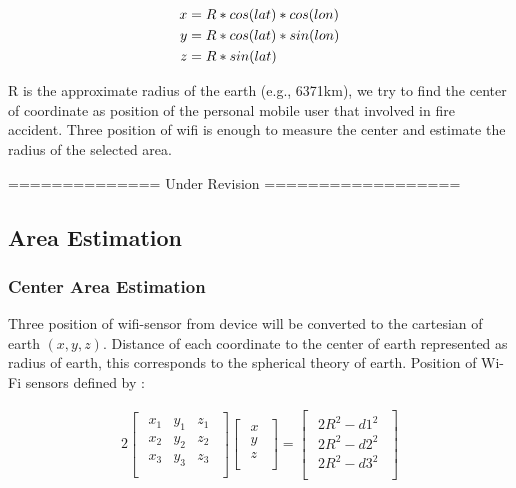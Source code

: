\documentclass[twocolumn,10pt]{asme2ej}
\begin{document}
	\begin{eqnarray}
	x &= R * cos(lat) * cos(lon) \notag \\
	y &= R * cos(lat) * sin(lon) \notag \\
	z &= R * sin(lat) 
	\end{eqnarray}
	
	R is the approximate radius of the earth (e.g., 6371km), we try to find the center of coordinate as position of the personal mobile user that involved in fire accident. Three position of wifi is enough to measure the center and estimate the radius of the selected area. 
	
	============== Under Revision ==================
	
	\subsection{Area Estimation}
    \subsubsection{Center Area Estimation}
    Three position of wifi-sensor from device will be converted to the cartesian of earth $(x,y,z)$. Distance of each coordinate to the center of earth represented as radius of earth, this corresponds to the spherical theory of earth. Position of Wi-Fi sensors defined by :

    \begin{gather}
    2
    \begin{bmatrix}
    \begin{array}{llll}
    x_1 & y_1 & z_1\\
    x_2 & y_2 & z_2\\
    x_3 & y_3 & z_3\\
    \end{array}
    \end{bmatrix}
    \begin{bmatrix}
    \begin{array}{llll}
    x\\
    y\\
    z\\
    \end{array}
    \end{bmatrix}
    =
    \begin{bmatrix}
    \begin{array}{llll}
    2R^2-d1^2\\
    2R^2-d2^2\\
    2R^2-d3^2\\
    \end{array}
    \end{bmatrix}
    \end{gather}
\end{document}
